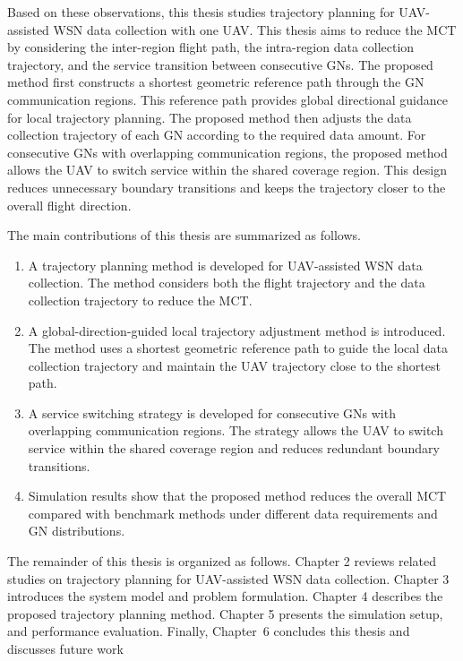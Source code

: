 \documentclass[12pt]{ksthesis}
\begin{document}
\begin{thesis}
{    Based on these observations, this thesis studies trajectory planning for UAV-assisted WSN data collection with one UAV. This thesis aims to reduce the MCT by considering the inter-region flight path, the intra-region data collection trajectory, and the service transition between consecutive GNs. The proposed method first constructs a shortest geometric reference path through the GN communication regions. This reference path provides global directional guidance for local trajectory planning. The proposed method then adjusts the data collection trajectory of each GN according to the required data amount. For consecutive GNs with overlapping communication regions, the proposed method allows the UAV to switch service within the shared coverage region. This design reduces unnecessary boundary transitions and keeps the trajectory closer to the overall flight direction.

    The main contributions of this thesis are summarized as follows.

    \begin{enumerate}
    	\item A trajectory planning method is developed for UAV-assisted WSN data collection. The method considers both the flight trajectory and the data collection trajectory to reduce the MCT.
    	\item A global-direction-guided local trajectory adjustment method is introduced. The method uses a shortest geometric reference path to guide the local data collection trajectory and maintain the UAV trajectory close to the shortest path.
    	\item A service switching strategy is developed for consecutive GNs with overlapping communication regions. The strategy allows the UAV to switch service within the shared coverage region and reduces redundant boundary transitions.
        \item Simulation results show that the proposed method reduces the overall MCT compared with benchmark methods under different data requirements and GN distributions.
    \end{enumerate}

    The remainder of this thesis is organized as follows. Chapter 2 reviews related studies on trajectory planning for UAV-assisted WSN data collection. Chapter 3 introduces the system model and problem formulation. Chapter 4 describes the proposed trajectory planning method. Chapter 5 presents the simulation setup, and performance evaluation. Finally, Chapter~6 concludes this thesis and discusses future work

}
\end{thesis}
\end{document}
